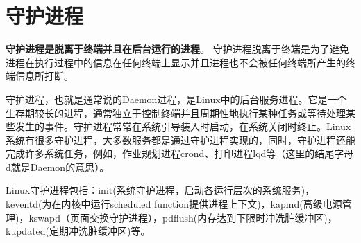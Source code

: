 \section{守护进程}

\textbf{守护进程是脱离于终端并且在后台运行的进程}。
守护进程脱离于终端是为了避免进程在执行过程中的信息在任何终端上显示并且进程也不会被任何终端所产生的终端信息所打断。

守护进程，也就是通常说的Daemon进程，是Linux中的后台服务进程。它是一个生存期较长的进程，通常独立于控制终端并且周期性地执行某种任务或等待处理某些发生的事件。守护进程常常在系统引导装入时启动，在系统关闭时终止。Linux系统有很多守护进程，大多数服务都是通过守护进程实现的，同时，守护进程还能完成许多系统任务，例如，作业规划进程crond、打印进程lqd等（这里的结尾字母d就是Daemon的意思）。

Linux守护进程包括：init(系统守护进程，启动各运行层次的系统服务)，keventd(为在内核中运行scheduled function提供进程上下文)，kapmd(高级电源管理)，kswapd（页面交换守护进程），pdflush(内存达到下限时冲洗脏缓冲区)，kupdated(定期冲洗脏缓冲区)等。

